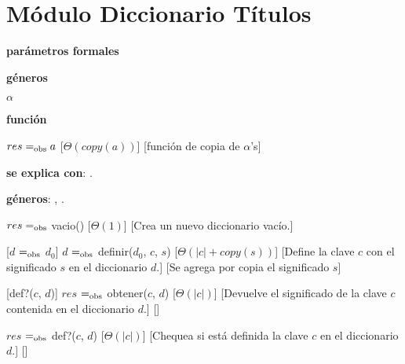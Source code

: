 \section{Módulo Diccionario Títulos }
\begin{Interfaz}
  
  \textbf{parámetros formales}\parindent\\
  \parbox{1.7cm}{\textbf{géneros}} $\alpha$\\
  \parbox[t]{1.7cm}{\textbf{función}}\parbox[t]{\textwidth-2\parindent-1.7cm}{%
    {$res =_{\mathrm{obs}} a$}
    [$\Theta(copy(a))$]
    [función de copia de $\alpha$'s]
  }

  \textbf{se explica con}: .

  \textbf{géneros}: , .


  {$res =_{\mathrm{obs}}$ vacio()}%
  [$\Theta(1)$]
  [Crea un nuevo diccionario vacío.]
  
  [$d$ $=_{\mathrm{obs}}$ $d_{0}$]
  {$d$ $=_{\mathrm{obs}}$ definir($d_{0}$, $c$, $s$)}
  [$\Theta(|c| + copy(s))$]
  [Define la clave $c$ con el significado $s$ en el diccionario $d$.]
  [Se agrega por copia el significado $s$] 

  [def?($c$, $d$)]
  {$res$ $=_{\mathrm{obs}}$ obtener($c$, $d$)}
  [$\Theta(|c|)$]
  [Devuelve el significado de la clave $c$ contenida en el diccionario $d$.]
  []
  
  {$res$ $=_{\mathrm{obs}}$ def?($c$, $d$)}
  [$\Theta(|c|)$]
  [Chequea si está definida la clave $c$ en el diccionario $d$.]
  []


\end{Interfaz}
